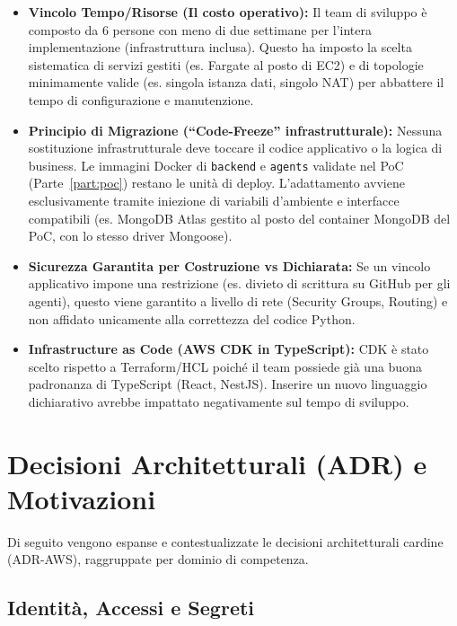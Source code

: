 \documentclass[11pt,a4paper]{article}
\begin{document}
\begin{itemize}
    \item \textbf{Vincolo Tempo/Risorse (Il costo operativo):} Il team di sviluppo è composto da 6 persone con meno di due settimane per l'intera implementazione (infrastruttura inclusa). Questo ha imposto la scelta sistematica di servizi gestiti (es. Fargate al posto di EC2) e di topologie minimamente valide (es. singola istanza dati, singolo NAT) per abbattere il tempo di configurazione e manutenzione.
    \item \textbf{Principio di Migrazione (``Code-Freeze'' infrastrutturale):} Nessuna sostituzione infrastrutturale deve toccare il codice applicativo o la logica di business. Le immagini Docker di \texttt{backend} e \texttt{agents} validate nel PoC (Parte~\ref{part:poc}) restano le unità di deploy. L'adattamento avviene esclusivamente tramite iniezione di variabili d'ambiente e interfacce compatibili (es. MongoDB Atlas gestito al posto del container MongoDB del PoC, con lo stesso driver Mongoose).
    \item \textbf{Sicurezza Garantita per Costruzione vs Dichiarata:} Se un vincolo applicativo impone una restrizione (es. divieto di scrittura su GitHub per gli agenti), questo viene garantito a livello di rete (Security Groups, Routing) e non affidato unicamente alla correttezza del codice Python.
    \item \textbf{Infrastructure as Code (AWS CDK in TypeScript):} CDK è stato scelto rispetto a Terraform/HCL poiché il team possiede già una buona padronanza di TypeScript (React, NestJS). Inserire un nuovo linguaggio dichiarativo avrebbe impattato negativamente sul tempo di sviluppo.
\end{itemize}

\section{Decisioni Architetturali (ADR) e Motivazioni}
\label{sec:aws-adr}

Di seguito vengono espanse e contestualizzate le decisioni architetturali cardine (ADR-AWS), raggruppate per dominio di competenza.

\subsection{Identità, Accessi e Segreti}
\end{document}
